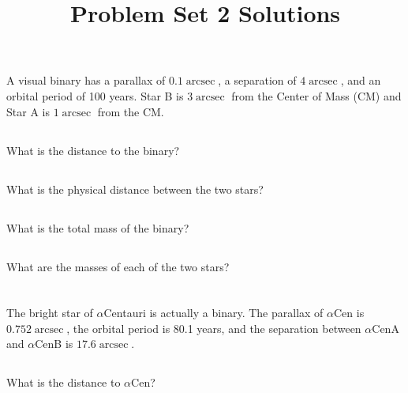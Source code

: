\documentclass[11pt]{scrartcl}
\title{Problem Set 2 Solutions}
\DeclareMathOperator{\arcsec}{arcsec}
\begin{document}
\maketitle

\section{}

A visual binary has a parallax of $0.1\arcsec$, a separation of $4 \arcsec$, and an orbital period of 100 years. Star B is $3 \arcsec$ from the Center of Mass (CM) and Star A is $1 \arcsec$ from the CM.

\subsection{}

What is the distance to the binary?

\subsection{}

What is the physical distance between the two stars?

\subsection{}

What is the total mass of the binary?

\subsection{}

What are the masses of each of the two stars?


\section{}

The bright star of $\alpha$Centauri is actually a binary. The parallax of $\alpha$Cen is $0.752\arcsec$, the orbital period is 80.1 years, and the separation between $\alpha$CenA and $\alpha$CenB is $17.6\arcsec$.

\subsection{}

What is the distance to $\alpha$Cen?
\end{document}
